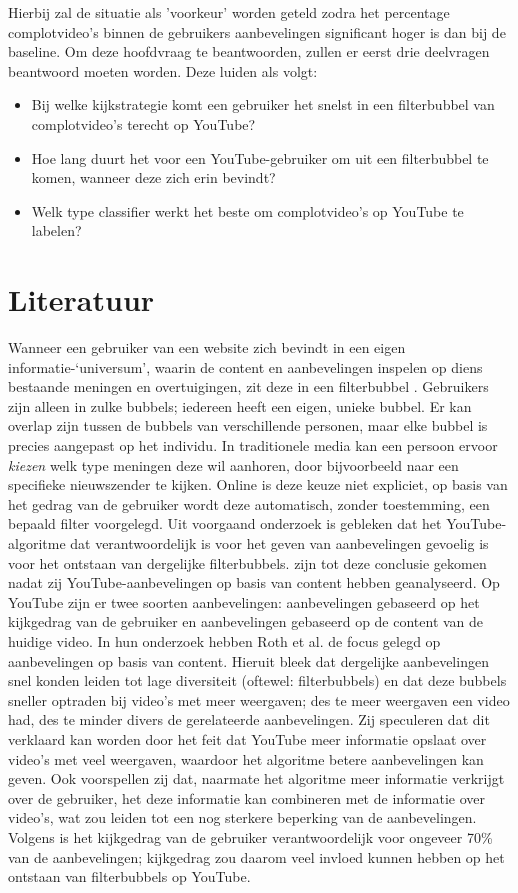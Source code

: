 \documentclass{uva-inf-article}
\begin{document}
Hierbij zal de situatie als 'voorkeur' worden geteld zodra het percentage complotvideo's binnen de gebruikers aanbevelingen significant hoger is dan bij de baseline. Om deze hoofdvraag te beantwoorden, zullen er eerst drie deelvragen beantwoord moeten worden. Deze luiden als volgt:

\begin{itemize}
    \item Bij welke kijkstrategie komt een gebruiker het snelst in een filterbubbel van complotvideo's terecht op YouTube?
    \item Hoe lang duurt het voor een YouTube-gebruiker om uit een filterbubbel te komen, wanneer deze zich erin bevindt?
    \item Welk type classifier werkt het beste om complotvideo’s op YouTube te labelen?
\end{itemize}

\section{Literatuur}
Wanneer een gebruiker van een website zich bevindt in een eigen informatie-‘universum’, waarin de content en aanbevelingen inspelen op diens bestaande meningen en overtuigingen, zit deze in een filterbubbel \citep{pariser2011filter}. Gebruikers zijn alleen in zulke bubbels; iedereen heeft een eigen, unieke bubbel. Er kan overlap zijn tussen de bubbels van verschillende personen, maar elke bubbel is precies aangepast op het individu. In traditionele media kan een persoon ervoor \textit{kiezen} welk type meningen deze wil aanhoren, door bijvoorbeeld naar een specifieke nieuwszender te kijken. Online is deze keuze niet expliciet, op basis van het gedrag van de gebruiker wordt deze automatisch, zonder toestemming, een bepaald filter voorgelegd. Uit voorgaand onderzoek is gebleken dat het YouTube-algoritme dat verantwoordelijk is voor het geven van aanbevelingen gevoelig is voor het ontstaan van dergelijke filterbubbels. \citet{roth2020tubes} zijn tot deze conclusie gekomen nadat zij YouTube-aanbevelingen op basis van content hebben geanalyseerd. Op YouTube zijn er twee soorten aanbevelingen: aanbevelingen gebaseerd op het kijkgedrag van de gebruiker en aanbevelingen gebaseerd op de content van de huidige video. In hun onderzoek hebben Roth et al. de focus gelegd op aanbevelingen op basis van content. Hieruit bleek dat dergelijke aanbevelingen snel konden leiden tot lage diversiteit (oftewel: filterbubbels) en dat deze bubbels sneller optraden bij video’s met meer weergaven; des te meer weergaven een video had, des te minder divers de gerelateerde aanbevelingen. Zij speculeren dat dit verklaard kan worden door het feit dat YouTube meer informatie opslaat over video’s met veel weergaven, waardoor het algoritme betere aanbevelingen kan geven. Ook voorspellen zij dat, naarmate het algoritme meer informatie verkrijgt over de gebruiker, het deze informatie kan combineren met de informatie over video’s, wat zou leiden tot een nog sterkere beperking van de aanbevelingen. Volgens \citet{ledwich2019algorithmic} is het kijkgedrag van de gebruiker verantwoordelijk voor ongeveer 70\% van de aanbevelingen; kijkgedrag zou daarom veel invloed kunnen hebben op het ontstaan van filterbubbels op YouTube.  
\end{document}
